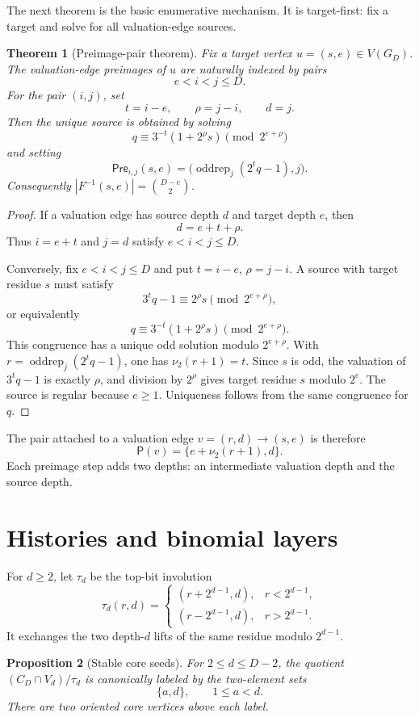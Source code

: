 \documentclass[11pt]{article}
\newtheorem{theorem}{Theorem}[section]
\newtheorem{proposition}[theorem]{Proposition}
\theoremstyle{definition}
\theoremstyle{remark}
\newcommand{\nuu}{\nu_2}
\newcommand{\oddrep}{\operatorname{oddrep}}
\newcommand{\Pre}{\mathsf{Pre}}
\newcommand{\Pair}{\mathsf P}
\begin{document}
The next theorem is the basic enumerative mechanism.  It is target-first: fix a target and solve for all valuation-edge sources.

\begin{theorem}[Preimage-pair theorem]\label{thm:preimage}
Fix a target vertex $u=(s,e)\in V(G_D)$.  The valuation-edge preimages of $u$ are naturally indexed by pairs
\[
e<i<j\le D.
\]
For the pair $(i,j)$, set
\[
t=i-e,
\qquad
\rho=j-i,
\qquad
 d=j.
\]
Then the unique source is obtained by solving
\[
q\equiv3^{-t}(1+2^\rho s)\pmod {2^{e+\rho}}
\]
and setting
\[
\Pre_{i,j}(s,e)=\bigl(\oddrep_j(2^tq-1),j\bigr).
\]
Consequently $|F^{-1}(s,e)|=\binom{D-e}{2}$.
\end{theorem}

\begin{proof}
If a valuation edge has source depth $d$ and target depth $e$, then
\[
d=e+t+\rho.
\]
Thus $i=e+t$ and $j=d$ satisfy $e<i<j\le D$.

Conversely, fix $e<i<j\le D$ and put $t=i-e$, $\rho=j-i$.  A source with target residue $s$ must satisfy
\[
3^tq-1\equiv2^\rho s\pmod {2^{e+\rho}},
\]
or equivalently
\[
q\equiv3^{-t}(1+2^\rho s)\pmod {2^{e+\rho}}.
\]
This congruence has a unique odd solution modulo $2^{e+\rho}$.  With $r=\oddrep_j(2^tq-1)$, one has $\nuu(r+1)=t$.  Since $s$ is odd, the valuation of $3^tq-1$ is exactly $\rho$, and division by $2^\rho$ gives target residue $s$ modulo $2^e$.  The source is regular because $e\ge1$.  Uniqueness follows from the same congruence for $q$.
\end{proof}

The pair attached to a valuation edge $v=(r,d)\to(s,e)$ is therefore
\[
\Pair(v)=\{e+\nuu(r+1),d\}.
\]
Each preimage step adds two depths: an intermediate valuation depth and the source depth.

\section{Histories and binomial layers}\label{sec:histories}

For $d\ge2$, let $\tau_d$ be the top-bit involution
\[
\tau_d(r,d)=
\begin{cases}
(r+2^{d-1},d),&r<2^{d-1},\\
(r-2^{d-1},d),&r>2^{d-1}.
\end{cases}
\]
It exchanges the two depth-$d$ lifts of the same residue modulo $2^{d-1}$.

\begin{proposition}[Stable core seeds]\label{prop:seeds}
For $2\le d\le D-2$, the quotient $(C_D\cap V_d)/\tau_d$ is canonically labeled by the two-element sets
\[
\{a,d\},\qquad 1\le a<d.
\]
There are two oriented core vertices above each label.
\end{proposition}
\end{document}
